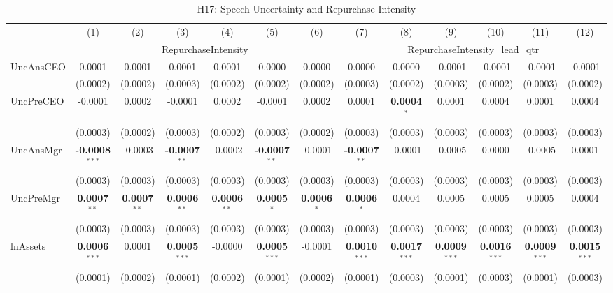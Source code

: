 \documentclass[11pt,a4paper]{article}
\begin{document}
\clearpage
\begin{table}[htbp]
\centering
\caption{H17: Speech Uncertainty and Repurchase Intensity}
\label{tab:h17}
\scriptsize
\begin{tabular}{lcccccccccccc}
\toprule
 & (1) & (2) & (3) & (4) & (5) & (6) & (7) & (8) & (9) & (10) & (11) & (12) \\
 & \multicolumn{6}{c}{RepurchaseIntensity} & \multicolumn{6}{c}{RepurchaseIntensity\_lead\_qtr} \\
\cmidrule(lr){2-7} \cmidrule(lr){8-13}
\midrule
UncAnsCEO & 0.0001 & 0.0001 & 0.0001 & 0.0001 & 0.0000 & 0.0000 & 0.0000 & 0.0000 & -0.0001 & -0.0001 & -0.0001 & -0.0001 \\
 & (0.0002) & (0.0002) & (0.0003) & (0.0002) & (0.0002) & (0.0002) & (0.0003) & (0.0002) & (0.0003) & (0.0002) & (0.0003) & (0.0002) \\
UncPreCEO & -0.0001 & 0.0002 & -0.0001 & 0.0002 & -0.0001 & 0.0002 & 0.0001 & \textbf{0.0004}$^{*}$ & 0.0001 & 0.0004 & 0.0001 & 0.0004 \\
 & (0.0003) & (0.0002) & (0.0003) & (0.0002) & (0.0003) & (0.0002) & (0.0003) & (0.0003) & (0.0003) & (0.0003) & (0.0003) & (0.0003) \\
UncAnsMgr & \textbf{-0.0008}$^{***}$ & -0.0003 & \textbf{-0.0007}$^{**}$ & -0.0002 & \textbf{-0.0007}$^{**}$ & -0.0001 & \textbf{-0.0007}$^{**}$ & -0.0001 & -0.0005 & 0.0000 & -0.0005 & 0.0001 \\
 & (0.0003) & (0.0003) & (0.0003) & (0.0003) & (0.0003) & (0.0003) & (0.0003) & (0.0003) & (0.0003) & (0.0003) & (0.0003) & (0.0003) \\
UncPreMgr & \textbf{0.0007}$^{**}$ & \textbf{0.0007}$^{**}$ & \textbf{0.0006}$^{**}$ & \textbf{0.0006}$^{**}$ & \textbf{0.0005}$^{*}$ & \textbf{0.0006}$^{*}$ & \textbf{0.0006}$^{*}$ & 0.0004 & 0.0005 & 0.0005 & 0.0005 & 0.0004 \\
 & (0.0003) & (0.0003) & (0.0003) & (0.0003) & (0.0003) & (0.0003) & (0.0003) & (0.0003) & (0.0003) & (0.0003) & (0.0003) & (0.0003) \\
\midrule
lnAssets & \textbf{0.0006}$^{***}$ & 0.0001 & \textbf{0.0005}$^{***}$ & -0.0000 & \textbf{0.0005}$^{***}$ & -0.0001 & \textbf{0.0010}$^{***}$ & \textbf{0.0017}$^{***}$ & \textbf{0.0009}$^{***}$ & \textbf{0.0016}$^{***}$ & \textbf{0.0009}$^{***}$ & \textbf{0.0015}$^{***}$ \\
 & (0.0001) & (0.0002) & (0.0001) & (0.0002) & (0.0001) & (0.0002) & (0.0001) & (0.0003) & (0.0001) & (0.0003) & (0.0001) & (0.0003) \\

\end{tabular}
\end{table}
\end{document}

